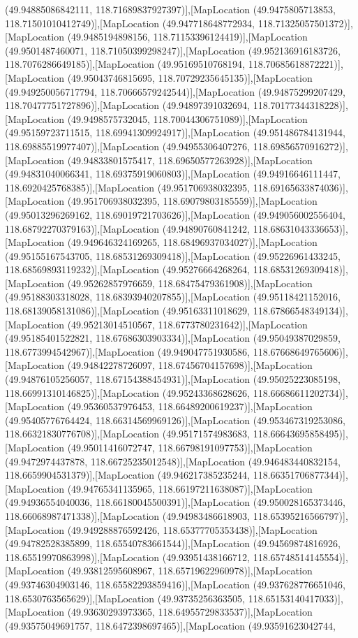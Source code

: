 (49.94885086842111, 118.71689837927397)],[MapLocation (49.9475805713853, 118.71501010412749)],[MapLocation (49.947718648772934, 118.71325057501372)],[MapLocation (49.9485194898156, 118.71153396124419)],[MapLocation (49.9501487460071, 118.71050399298247)],[MapLocation (49.952136916183726, 118.7076286649185)],[MapLocation (49.95169510768194, 118.70685618872221)],[MapLocation (49.95043746815695, 118.70729235645135)],[MapLocation (49.949250056717794, 118.70666579242544)],[MapLocation (49.94875299207429, 118.70477751727896)],[MapLocation (49.94897391032694, 118.70177344318228)],[MapLocation (49.9498575732045, 118.70044306751089)],[MapLocation (49.95159723711515, 118.69941309924917)],[MapLocation (49.951486784131944, 118.69885519977407)],[MapLocation (49.94955306407276, 118.69856570916272)],[MapLocation (49.94833801575417, 118.69650577263928)],[MapLocation (49.94831040066341, 118.69375919060803)],[MapLocation (49.94916646111447, 118.6920425768385)],[MapLocation (49.951706938032395, 118.69165633874036)],[MapLocation (49.951706938032395, 118.69079803185559)],[MapLocation (49.95013296269162, 118.69019721703626)],[MapLocation (49.949056002556404, 118.68792270379163)],[MapLocation (49.94890760841242, 118.68631043336653)],[MapLocation (49.949646324169265, 118.68496937034027)],[MapLocation (49.95155167543705, 118.68531269309418)],[MapLocation (49.95226961433245, 118.68569893119232)],[MapLocation (49.95276664268264, 118.68531269309418)],[MapLocation (49.95262857976659, 118.68475479361908)],[MapLocation (49.95188303318028, 118.68393940207855)],[MapLocation (49.95118421152016, 118.68139058131086)],[MapLocation (49.95163311018629, 118.67866548349134)],[MapLocation (49.95213014510567, 118.6773780231642)],[MapLocation (49.95185401522821, 118.67686303903334)],[MapLocation (49.95049387029859, 118.6773994542967)],[MapLocation (49.949047751930586, 118.67668649765606)],[MapLocation (49.94842278726097, 118.67456704157698)],[MapLocation (49.94876105256057, 118.67154388454931)],[MapLocation (49.95025223085198, 118.66991310146825)],[MapLocation (49.95243368628626, 118.66686611202734)],[MapLocation (49.95360537976453, 118.66489200619237)],[MapLocation (49.95405776764424, 118.66314569969126)],[MapLocation (49.953467319253086, 118.66321830776708)],[MapLocation (49.95171574983683, 118.66643695858495)],[MapLocation (49.95011416072747, 118.66798191097753)],[MapLocation (49.9472974437878, 118.66725235012548)],[MapLocation (49.946483440832154, 118.6659904531379)],[MapLocation (49.946217385235244, 118.66351706877344)],[MapLocation (49.94765341135965, 118.66197211638087)],[MapLocation (49.94936554040036, 118.66180045500391)],[MapLocation (49.950028165373446, 118.66068987471338)],[MapLocation (49.94983486618903, 118.65395216566797)],[MapLocation (49.949288876592426, 118.65377705353438)],[MapLocation (49.94782528385899, 118.65540783661544)],[MapLocation (49.94569874816926, 118.65519970863998)],[MapLocation (49.93951438166712, 118.65748514145554)],[MapLocation (49.93812595608967, 118.65719622960978)],[MapLocation (49.93746304903146, 118.65582293859416)],[MapLocation (49.937628776651046, 118.6530763565629)],[MapLocation (49.93735256363505, 118.65153140417033)],[MapLocation (49.93630293973365, 118.64955729833537)],[MapLocation (49.93575049691757, 118.6472398697465)],[MapLocation (49.93591623042744, 